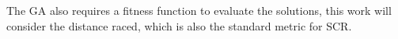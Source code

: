 The GA also requires a fitness function to evaluate the solutions, this work will consider the distance raced, which is also the standard metric for SCR.


